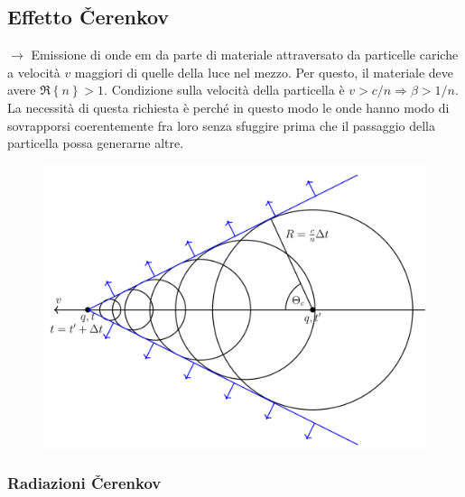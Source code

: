 \documentclass[10pt, a4paper]{scrartcl}
\numberwithin{equation}{subsection}
\theoremstyle{style1}
\begin{document}
\subsection{Effetto \v Cerenkov}
$\to $ Emissione di onde em da parte di materiale attraversato da particelle cariche a velocit\`a $v$ maggiori di quelle della luce nel mezzo. Per questo, il materiale deve avere $\Re\left\{ n \right\} > 1$. Condizione sulla velocit\`a della particella \`e $v > c / n\Rightarrow  \beta  > 1 / n$. La necessit\`a di questa richiesta \`e perch\'e in questo modo le onde hanno modo di sovrapporsi coerentemente fra loro senza sfuggire prima che il passaggio della particella possa generarne altre.
\begin{figure}[h!]
	\centering
	\includegraphics[width=.5\columnwidth]{c1.png}
\end{figure}

\subsubsection{Radiazioni \v Cerenkov}
\end{document}
